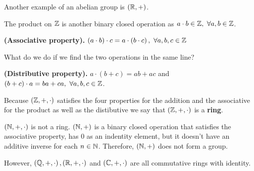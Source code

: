 {\begin{example}
    Another example of an abelian group is $\left( \mathbb{R}, + \right) $.
\end{example}

The product on $\mathbb{Z}$ is another binary closed operation as $a\cdot b\in\Z,\ \forall a, b\in\Z$.

\begin{proposition}
    \textbf{(Associative property).} $\left( a \cdot b \right) \cdot c = a \cdot \left( b \cdot c \right) ,\ \forall a, b, c\in\mathbb{Z}$
\end{proposition}

What do we do if we find the two operations in the same line?

\begin{proposition}
    \textbf{(Distributive property).} $a\cdot\left( b + c \right) = ab + ac$ and $\left( b + c \right)\cdot a = ba + ca,\ \forall a, b, c\in\Z $.
\end{proposition}

Because $\left( \mathbb{Z}, +, \cdot \right) $ satisfies the four properties for the addition and the associative for the product as well as the distibutive we say that $\left( \mathbb{Z}, +, \cdot \right) $ is a \textbf{ring}.
}

\begin{example}
    $\left( \mathbb{N}, +, \cdot \right) $ is not a ring. $\left( \mathbb{N}, + \right) $ is a binary closed operation that satisfies the associative property, has $0$ as an indentity element, but it doesn't have an additive inverse for each $n\in\mathbb{N}$. Therefore, $\left( \mathbb{N}, + \right) $ does not form a group.

    However, $\left( \mathbb{Q}, +, \cdot \right), \left( \mathbb{R}, +, \cdot \right) $ and $\left( \mathbb{C}, +, \cdot \right)$
    are all commutative rings with identity.
\end{example}



